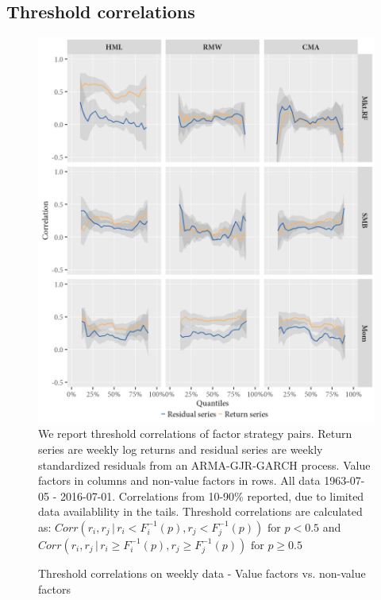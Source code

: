 \subsection{Threshold correlations}
\begin{figure}[H]
  \caption{Threshold correlations on weekly data - Value factors vs. non-value factors}
  \label{diag:thresholdnonvalue}
  \toprule
  \centering
  \begin{minipage}{\textwidth}
  \includegraphics[scale=1]{graphics/threshold_Nonvalue.png}  
  \bottomrule
  \vspace{3mm}
  \footnotesize
  We report threshold correlations of factor strategy pairs. Return series are weekly log returns and residual series are weekly standardized residuals from an ARMA-GJR-GARCH process. Value factors in columns and non-value factors in rows. All data 1963-07-05 - 2016-07-01. Correlations from 10-90\% reported, due to limited data availablility in the tails. Threshold correlations are calculated as: $Corr(r_i, r_j \,|\, r_i < F_i^{-1}(p), r_j < F_j^{-1}(p)) \text{ for } p < 0.5$ and $Corr(r_i, r_j \,|\, r_i \geq F_i^{-1}(p), r_j \geq F_j^{-1}(p)) \text{ for } p \geq 0.5$
  \end{minipage}
\end{figure}

